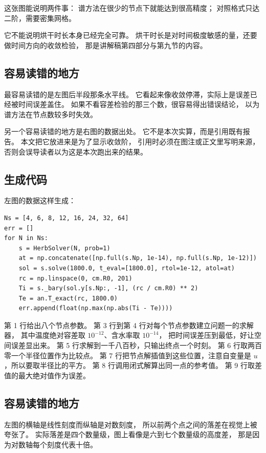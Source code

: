 \documentclass[11pt,a4paper]{article}
\begin{document}
这张图能说明两件事：
谱方法在很少的节点下就能达到很高精度；
对照格式只达二阶，需要密集网格。

它不能说明烘干时长本身已经完全可靠。
烘干时长是对时间极度敏感的量，还要做时间方向的收敛检验，
那是讲解稿第四部分与第九节的内容。

\subsection{容易读错的地方}

最容易读错的是左图后半段那条水平线。
它看起来像收敛停滞，实际上是误差已经被时间误差盖住。
如果不看容差检验的那三个数，很容易得出错误结论，
以为谱方法在节点数较多时失效。

另一个容易读错的地方是右图的数据出处。
它不是本次实算，而是引用既有报告。
本文把它放进来是为了显示收敛阶，
引用时必须在图注或正文里写明来源，
否则会误导读者以为这是本次跑出来的结果。

\subsection{生成代码}

左图的数据这样生成：

\begin{lstlisting}
Ns = [4, 6, 8, 12, 16, 24, 32, 64]
err = []
for N in Ns:
    s = HerbSolver(N, prob=1)
    at = np.concatenate([np.full(s.Np, 1e-14), np.full(s.Np, 1e-12)])
    sol = s.solve(1800.0, t_eval=[1800.0], rtol=1e-12, atol=at)
    rc = np.linspace(0, cm.R0, 201)
    Ti = s._bary(sol.y[s.Np:, -1], (rc / cm.R0) ** 2)
    Te = an.T_exact(rc, 1800.0)
    err.append(float(np.max(np.abs(Ti - Te))))
\end{lstlisting}

第 1 行给出八个节点参数。
第 3 行到第 4 行对每个节点参数建立问题一的求解器，
其中温度绝对容差取 $10^{-12}$、含水率取 $10^{-14}$，
把时间误差压到最低，好让空间误差显出来。
第 5 行求解到一千八百秒，只输出终点一个时刻。
第 6 行取两百零一个半径位置作为比较点。
第 7 行把节点解插值到这些位置，注意自变量是 $u$，所以要取半径比的平方。
第 8 行调用闭式解算出同一点的参考值。
第 9 行取差值的最大绝对值作为误差。

\subsection{容易读错的地方}

左图的横轴是线性刻度而纵轴是对数刻度，
所以前两个点之间的落差在视觉上被夸张了。
实际落差是四个数量级，图上看像是六到七个数量级的高度差，
那是因为对数轴每个刻度代表十倍。
\end{document}
